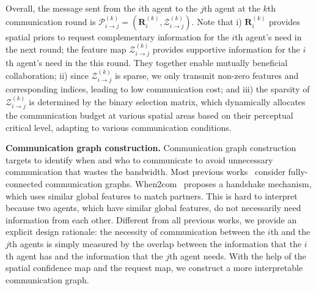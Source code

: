Overall, the message sent from the $i$th agent to the $j$th agent at the $k$th communication round is $\mathcal{P}_{i\rightarrow j}^{(k)}=(\mathbf{R}_{i}^{(k)}, \mathcal{Z}_{i\rightarrow j}^{(k)} )$. Note that i) $\mathbf{R}_{i}^{(k)}$ provides spatial priors to request complementary information for the $i$th agent's need in the next round; the feature map $ \mathcal{Z}_{i\rightarrow j}^{(k)}$ provides supportive information for the $i$th agent's need in the this round. They together enable mutually beneficial collaboration; ii) since  $\mathcal{Z}_{i\rightarrow j}^{(k)}$ is sparse, we only transmit non-zero features and corresponding indices, leading to low communication cost; and iii) the sparsity of $\mathcal{Z}_{i\rightarrow j}^{(k)}$ is determined by the binary selection matrix, which dynamically allocates the communication budget at various spatial areas based on their perceptual critical level, adapting to various communication conditions. 




\textbf{Communication graph construction.} Communication graph construction targets to identify when and who to communicate to avoid unnecessary communication that wastes the bandwidth. Most previous works~\cite{v2vnet,disconet,OPV2V} consider fully-connected communication graphs. When2com~\cite{when2com} proposes a handshake mechanism, which uses similar global features to match partners. This is hard to interpret because two agents, which have similar global features, do not necessarily need information from each other. Different from all previous works, we provide an explicit design rationale: the necessity of communication between the $i$th and the $j$th agents is simply measured by the overlap between the information that the $i$th agent has and the information that the $j$th agent needs. With the help of the spatial confidence map and the request map, we construct a more interpretable communication graph.

